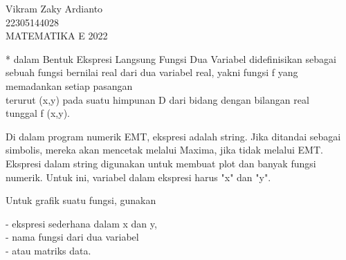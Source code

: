 \documentclass{article}
\begin{document}
\begin{eulernotebook}
\begin{eulercomment}
Vikram Zaky Ardianto\\
22305144028\\
MATEMATIKA E 2022

\begin{eulercomment}
\begin{eulercomment}
* dalam Bentuk Ekspresi Langsung 
Fungsi Dua Variabel didefinisikan sebagai sebuah fungsi bernilai real
dari dua variabel real, yakni fungsi f yang memadankan setiap pasangan\\
terurut (x,y) pada suatu himpunan D dari bidang dengan bilangan real\\
tunggal f (x,y).

Di dalam program numerik EMT, ekspresi adalah string. Jika ditandai
sebagai simbolis, mereka akan mencetak melalui Maxima, jika tidak
melalui EMT. Ekspresi dalam string digunakan untuk membuat plot dan
banyak fungsi numerik. Untuk ini, variabel dalam ekspresi harus "x"
dan "y".

Untuk grafik suatu fungsi, gunakan

- ekspresi sederhana dalam x dan y,\\
- nama fungsi dari dua variabel\\
- atau matriks data.


\end{eulercomment}
\end{eulercomment}
\end{eulercomment}
\end{eulernotebook}
\end{document}
